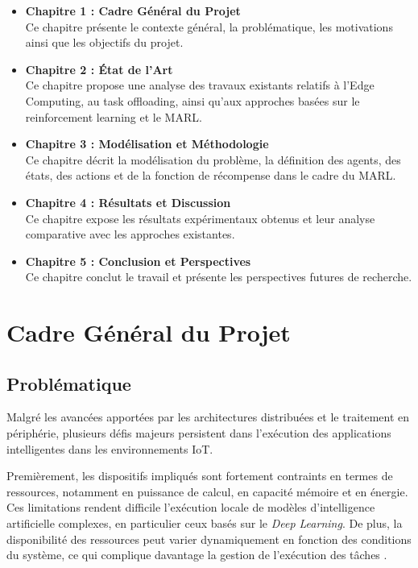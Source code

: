 \documentclass[12pt,a4paper]{report}
\begin{document}
\begin{itemize}
    \item \textbf{Chapitre 1 : Cadre Général du Projet} \\
    Ce chapitre présente le contexte général, la problématique, les motivations ainsi que les objectifs du projet.

    \item \textbf{Chapitre 2 : État de l’Art} \\
    Ce chapitre propose une analyse des travaux existants relatifs à l’Edge Computing, au task offloading, ainsi qu’aux approches basées sur le reinforcement learning et le MARL.

    \item \textbf{Chapitre 3 : Modélisation et Méthodologie} \\
    Ce chapitre décrit la modélisation du problème, la définition des agents, des états, des actions et de la fonction de récompense dans le cadre du MARL.

    \item \textbf{Chapitre 4 : Résultats et Discussion} \\
    Ce chapitre expose les résultats expérimentaux obtenus et leur analyse comparative avec les approches existantes.

    \item \textbf{Chapitre 5 : Conclusion et Perspectives} \\
    Ce chapitre conclut le travail et présente les perspectives futures de recherche.
\end{itemize}

\chapter{Cadre Général du Projet}

\section{Problématique}

Malgré les avancées apportées par les architectures distribuées et le traitement en périphérie, plusieurs défis majeurs persistent dans l’exécution des applications intelligentes dans les environnements IoT.

Premièrement, les dispositifs impliqués sont fortement contraints en termes de ressources, notamment en puissance de calcul, en capacité mémoire et en énergie. Ces limitations rendent difficile l’exécution locale de modèles d’intelligence artificielle complexes, en particulier ceux basés sur le \textit{Deep Learning}. De plus, la disponibilité des ressources peut varier dynamiquement en fonction des conditions du système, ce qui complique davantage la gestion de l’exécution des tâches \cite{liu2020marl}.
\end{document}
